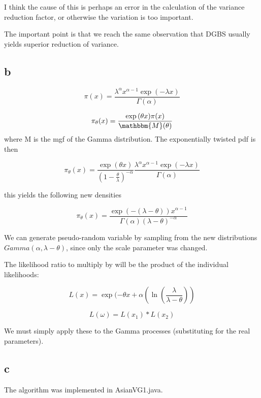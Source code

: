 \documentclass[12pt]{report}
\begin{document}
I think the cause of this is perhaps an error in the calculation of the variance reduction factor, or otherwise the variation is too important.

The important point is that we reach the same observation that DGBS usually yields superior reduction of variance.




\subsection*{b}

$$
\pi(x) = \dfrac{\lambda^\alpha x^{\alpha -1} \exp{(- \lambda x)}}{\Gamma(\alpha)}
$$

$$
\pi_{\theta}(x) = \dfrac{\exp{(\theta x)} \pi(x)}{\mathbbm{M}(\theta)}
$$
where M is the mgf of the Gamma distribution. The exponentially twisted pdf is then

$$
\pi_{\theta}(x) =
\dfrac{\exp(\theta x)}{(1 - \frac{\theta}{\lambda})^{-\alpha}}
\dfrac{\lambda^\alpha x^{\alpha -1} \exp(- \lambda x)}{\Gamma(\alpha)}
$$

this yields the following new densities

$$
\pi_{\theta}(x) = \dfrac{\exp(- (\lambda - \theta)) x^{\alpha - 1}}{\Gamma(\alpha) (\lambda - \theta)^{-\alpha}}
$$

We can generate pseudo-random variable by sampling from the new distributions $Gamma(\alpha, \lambda - \theta)$, since only the scale parameter was changed. 

\vspace{1 cm}
The likelihood ratio to multiply by will be the product of the individual likelihoods:

$$
L(x) = \exp( -\theta x + \alpha(\ln(\frac{\lambda}{\lambda - \theta}))
$$

$$
	L(\omega) = L(x_1) * L(x_2) 
$$

We must simply apply these to the Gamma processes (substituting for the real parameters).



\subsection*{c}

The algorithm was implemented in AsianVG1.java.
\end{document}

